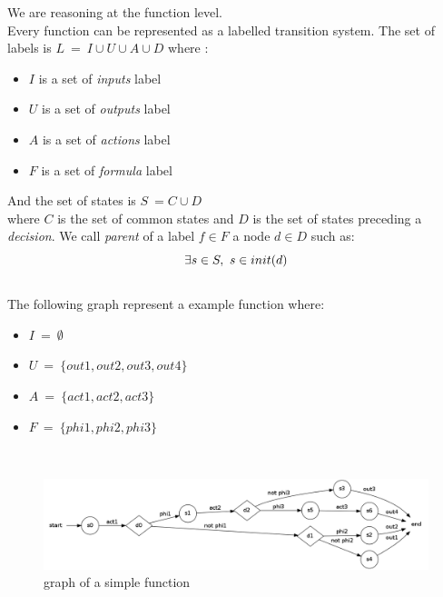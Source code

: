 \documentclass[a4paper]{report}
\begin{document}
We are reasoning at the function level.\\
Every function can be represented as a labelled transition system. The set of labels is $L\ =\ I \cup U \cup A \cup D$ where :\\
\begin{itemize}
\item $I$ is a set of \textit{inputs} label
\item $U$ is a set of \textit{outputs} label
\item $A$ is a set of \textit{actions} label
\item $F$ is a set of \textit{formula} label
\end{itemize}
And the set of states is $S\ = C \cup D$\\
where $C$ is the set of common states and $D$ is the set of states preceding a \textit{decision}.
We call \textit{parent} of a label $f \in F$ a node $d \in D$ such as:\\
\[
\exists s \in S,\ s \in init(d)\\
\]
$ $\\
\newline
The following graph represent a example function where:
\begin{itemize}
\item $I\ =\ \emptyset$
\item $U\ =\ \{out1, out2, out3, out4\}$
\item $A\ =\ \{act1, act2, act3\}$
\item $F\ =\ \{phi1, phi2, phi3\}$
\end{itemize}
$ $\\
\begin{figure}[h!]
  \caption{graph of a simple function}
  \centering
    \includegraphics[scale=0.3]{../graphviz/LTSExample.png}
\end{figure}
$ $\\
\newline
\end{document}
